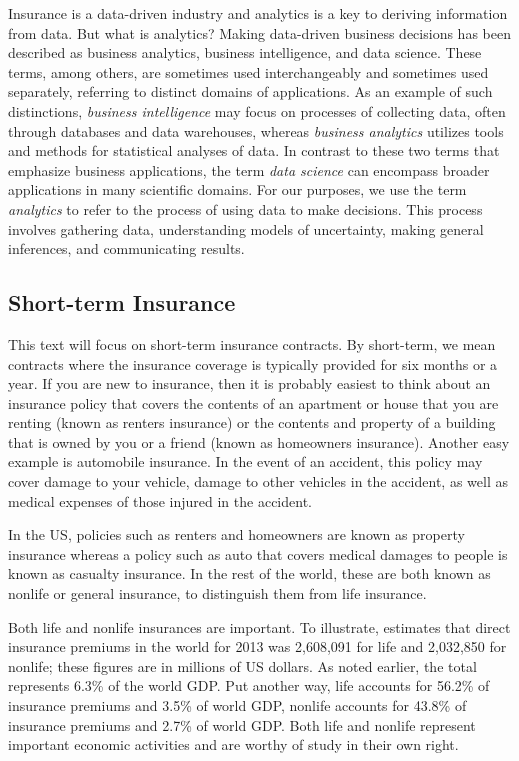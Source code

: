 \documentclass[]{book}
\begin{document}
Insurance is a data-driven industry and analytics is a key to deriving
information from data. But what is analytics? Making data-driven
business decisions has been described as business analytics, business
intelligence, and data science. These terms, among others, are sometimes
used interchangeably and sometimes used separately, referring to
distinct domains of applications. As an example of such distinctions,
\emph{business intelligence} may focus on processes of collecting data,
often through databases and data warehouses, whereas \emph{business
analytics} utilizes tools and methods for statistical analyses of data.
In contrast to these two terms that emphasize business applications, the
term \emph{data science} can encompass broader applications in many
scientific domains. For our purposes, we use the term \emph{analytics}
to refer to the process of using data to make decisions. This process
involves gathering data, understanding models of uncertainty, making
general inferences, and communicating results.

\subsection{Short-term Insurance}\label{short-term-insurance}

This text will focus on short-term insurance contracts. By short-term,
we mean contracts where the insurance coverage is typically provided for
six months or a year. If you are new to insurance, then it is probably
easiest to think about an insurance policy that covers the contents of
an apartment or house that you are renting (known as renters insurance)
or the contents and property of a building that is owned by you or a
friend (known as homeowners insurance). Another easy example is
automobile insurance. In the event of an accident, this policy may cover
damage to your vehicle, damage to other vehicles in the accident, as
well as medical expenses of those injured in the accident.

In the US, policies such as renters and homeowners are known as property
insurance whereas a policy such as auto that covers medical damages to
people is known as casualty insurance. In the rest of the world, these
are both known as nonlife or general insurance, to distinguish them from
life insurance.

Both life and nonlife insurances are important. To illustrate,
\citep{III2015} estimates that direct insurance premiums in the world
for 2013 was 2,608,091 for life and 2,032,850 for nonlife; these figures
are in millions of US dollars. As noted earlier, the total represents
6.3\% of the world GDP. Put another way, life accounts for 56.2\% of
insurance premiums and 3.5\% of world GDP, nonlife accounts for 43.8\%
of insurance premiums and 2.7\% of world GDP. Both life and nonlife
represent important economic activities and are worthy of study in their
own right.
\end{document}
